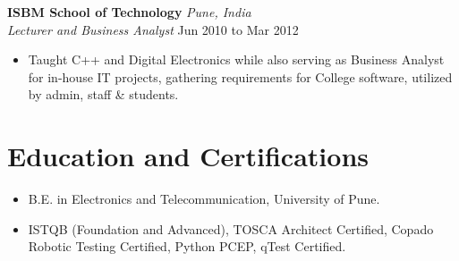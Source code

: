 \documentclass[11pt, a4paper]{article}
\newcommand{\roleheader}[4]{%
    \noindent\textbf{#1} \hfill \textit{#2}\\
    \textit{#3} \hfill #4\par\vspace{2pt}
}
\begin{document}
\roleheader{ISBM School of Technology}{Pune, India}{Lecturer and Business Analyst}{Jun 2010 to Mar 2012}

\begin{itemize}
    \item Taught C++ and Digital Electronics while also serving as Business Analyst for in-house IT projects, gathering requirements for College software, utilized by admin, staff \& students.
\end{itemize}

\section{Education and Certifications}

\begin{itemize}
    \item B.E. in Electronics and Telecommunication, University of Pune.
    \item ISTQB (Foundation and Advanced), TOSCA Architect Certified, Copado Robotic Testing Certified, Python PCEP, qTest Certified.
\end{itemize}
\end{document}
